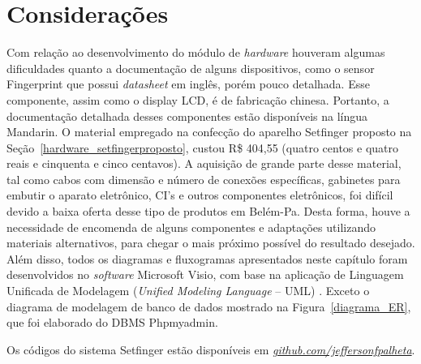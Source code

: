   

\section{Considerações}

Com relação ao desenvolvimento do módulo de \textit{hardware} houveram algumas dificuldades quanto a documentação de alguns dispositivos, como o sensor Fingerprint que possui \textit{datasheet} em inglês, porém pouco detalhada. Esse componente, assim como o display LCD, é de fabricação chinesa. Portanto, a documentação detalhada desses componentes estão disponíveis na língua Mandarin. O material empregado na confecção do aparelho Setfinger proposto na Seção~\ref{hardware_setfingerproposto}, custou R{\$} 404,55 (quatro centos e quatro reais e cinquenta e cinco centavos). A aquisição de grande parte desse material, tal como cabos com dimensão e número de conexões específicas, gabinetes para embutir o aparato eletrônico, CI's e outros componentes eletrônicos, foi difícil devido a baixa oferta desse tipo de produtos em Belém-Pa. Desta forma, houve a necessidade de encomenda de alguns componentes e adaptações utilizando materiais alternativos, para chegar o mais próximo possível do resultado desejado. Além disso, todos os diagramas e fluxogramas apresentados neste capítulo foram desenvolvidos no \textit{software} Microsoft Visio, com base na aplicação de Linguagem Unificada de Modelagem (\textit{Unified Modeling Language} -- UML) \cite{biafore2007visio, naiburg2001uml}. Exceto o diagrama de modelagem de banco de dados mostrado na Figura~\ref{diagrama_ER}, que foi elaborado do DBMS Phpmyadmin.


Os códigos do sistema Setfinger estão disponíveis em \href{https://github.com/jeffersonfpalheta/setfinger_system}{\textit{github.com/jeffersonfpalheta}}.

